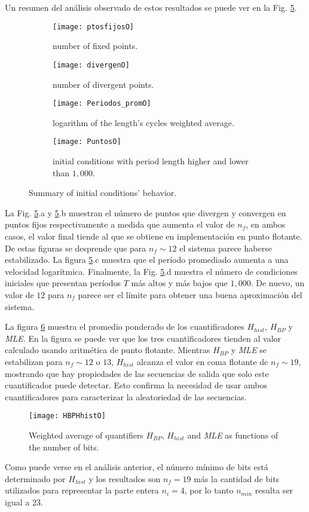 Un resumen del análisis observado de estos resultados se puede ver en la Fig. \ref{puntos}.
%
\begin{figure}
	\centering
	\begin{subfigure}[b]{0.49\textwidth}
		\texttt{[image: ptosfijosO]}
		\caption{number of fixed points.}
		\label{fig:gull}
	\end{subfigure}
	\hfill 
	\begin{subfigure}[b]{0.49\textwidth}
		\texttt{[image: divergenO]}
		\caption{number of divergent points.}
		\label{fig:tiger}
	\end{subfigure}
	\hfill 
	\begin{subfigure}[b]{0.49\textwidth}
		\texttt{[image: Periodos\_promO]}
		\caption{logarithm of the length's cycles weighted average.}
		\label{fig:mouse}
	\end{subfigure}
	\hfill   
	\begin{subfigure}[b]{0.49\textwidth}
		\texttt{[image: PuntosO]}
		\caption{initial conditions with period length higher and lower than $1,000$.}
		\label{fig:mouse}
	\end{subfigure}
	\caption{Summary of initial conditions' behavior.}\label{puntos}
\end{figure}
%
La Fig. \ref{puntos}.a y \ref{puntos}.b muestran el número de puntos que divergen y convergen en puntos fijos respectivamente a medida que aumenta el valor de $n_f$, en ambos casos, el valor final tiende al que se obtiene en implementación en punto flotante.
De estas figuras se desprende que para $n_f \sim 12$ el sistema parece haberse estabilizado.
La figura \ref{puntos}.c muestra que el período promediado aumenta a una velocidad logarítmica.
Finalmente, la Fig. \ref{puntos}.d muestra el número de condiciones iniciales que presentan períodos $T$ más altos y más bajos que $1,000$.
De nuevo, un valor de $12$ para $n_f$ parece ser el límite para obtener una buena aproximación del sistema.

La figura \ref{fig:HBPHhist} muestra el promedio ponderado de los cuantificadores $H_{hist}$, $H_{BP}$ y \textsl{MLE}.
En la figura se puede ver que los tres cuantificadores tienden al valor calculado usando aritmética de punto flotante.
Mientras $H_{BP}$ y \textsl{MLE} se estabilizan para $n_f \sim 12$ o $13$, $H_{hist}$ alcanza el valor en coma flotante de $n_f \sim 19$, mostrando que hay propiedades de las secuencias de salida que solo este cuantificador puede detectar.
Esto confirma la necesidad de usar ambos cuantificadores para caracterizar la aleatoriedad de las secuencias.
%
\begin{figure}
	\centering
	\texttt{[image: HBPHhistO]}\\
	\caption{Weighted average of quantifiers $H_{BP}$,  $H_{hist}$ and \textsl{MLE} as functions of the number of bits.}\label{fig:HBPHhist}
\end{figure}
%
Como puede verse en el análisis anterior, el número mínimo de bits está determinado por $H_{hist}$ y los resultados son $n_f = 19$ más la cantidad de bits utilizados para representar la parte entera $n_i = 4$, por lo tanto $n_{min}$ resulta ser igual a $23$.

